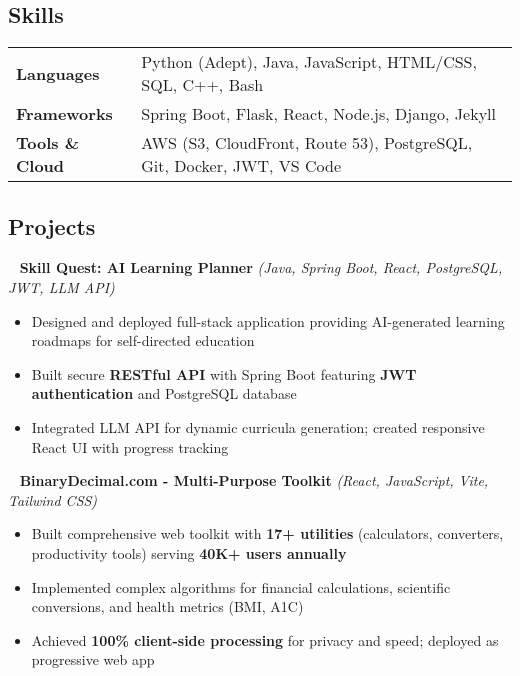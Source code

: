 \documentclass[11pt,letterpaper]{article}
\newcommand{\normalsizesection}{\normalsize}
\newcommand{\smallersection}{\small}
\newcommand{\sectionbox}[1]{%
    \vspace{0.2em}
    \begin{tcolorbox}[
        colback=sectionbg,
        colframe=sectionbg,
        width=\textwidth,
        left=5pt,
        right=5pt,
        top=2pt,
        bottom=2pt,
        boxrule=0pt,
        arc=0pt,
        boxsep=0pt,
    ]
    \section*{#1}
    \end{tcolorbox}
    \vspace{-0.3em}
}
\newcommand{\tech}[1]{\textit{(#1)}}
\newenvironment{projectentry}{%
    \leftskip=0cm
    \par\noindent
}{\par\leftskip=0cm\vspace{-2pt}}
\newenvironment{projectdesc}{%
    \footnotesize
    \begin{itemize}[leftmargin=*, topsep=0pt, itemsep=1pt, parsep=0pt]
}{\end{itemize}\smallersection\vspace{-1pt}}
\newcommand{\projicon}[1]{%
    {\small\color{gray!70}#1}~%
}
\begin{document}
\normalsizesection

\sectionbox{Skills}
\smallersection

\begin{tabularx}{\textwidth}{@{} l X @{}}
\textbf{Languages} & Python (Adept), Java, JavaScript, HTML/CSS, SQL, C++, Bash \\[2pt]
\textbf{Frameworks} & Spring Boot, Flask, React, Node.js, Django, Jekyll \\[2pt]
\textbf{Tools \& Cloud} & AWS (S3, CloudFront, Route 53), PostgreSQL, Git, Docker, JWT, VS Code
\end{tabularx}

\normalsizesection

\sectionbox{Projects}
\smallersection

\begin{projectentry}
    \projicon{\faRobot} \textbf{Skill Quest: AI Learning Planner} \tech{Java, Spring Boot, React, PostgreSQL, JWT, LLM API}
\end{projectentry}
\begin{projectdesc}
    \item Designed and deployed full-stack application providing AI-generated learning roadmaps for self-directed education
    \item Built secure \textbf{RESTful API} with Spring Boot featuring \textbf{JWT authentication} and PostgreSQL database
    \item Integrated LLM API for dynamic curricula generation; created responsive React UI with progress tracking
\end{projectdesc}

\begin{projectentry}
    \projicon{\faCalculator} \textbf{BinaryDecimal.com - Multi-Purpose Toolkit} \tech{React, JavaScript, Vite, Tailwind CSS}
\end{projectentry}
\begin{projectdesc}
    \item Built comprehensive web toolkit with \textbf{17+ utilities} (calculators, converters, productivity tools) serving \textbf{40K+ users annually}
    \item Implemented complex algorithms for financial calculations, scientific conversions, and health metrics (BMI, A1C)
    \item Achieved \textbf{100\% client-side processing} for privacy and speed; deployed as progressive web app
\end{projectdesc}
\end{document}
